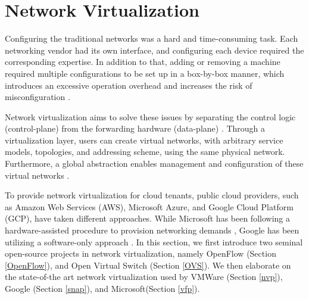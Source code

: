 
\section{Network Virtualization}
%
%
%
%
%


Configuring the traditional networks was a hard and time-consuming task. Each networking vendor had its own interface, and configuring each device required the corresponding expertise. In addition to that, adding or removing a machine required multiple configurations to be set up in a box-by-box manner, which introduces an excessive operation overhead and increases the risk of misconfiguration \cite{cearley2013top, marty2019snap}.

Network virtualization aims to solve these issues by separating the control logic (control-plane) from the forwarding hardware (data-plane) \cite{koponen2014network, caesar2005design, casado2007ethane, gude2008nox, koponen2010onix, mckeown2008openflow}. Through a virtualization layer, users can create virtual networks, with arbitrary service models, topologies, and addressing scheme, using the same physical network. Furthermore, a global abstraction enables management and configuration of these virtual networks \cite{mckeown2008openflow}.

To provide network virtualization for cloud tenants, public cloud providers, such as Amazon Web Services (AWS), Microsoft Azure, and Google Cloud Platform (GCP), have taken different approaches. While Microsoft has been following a hardware-assisted procedure to provision networking demands \cite{firestone2018azure, firestone2017vfp}, Google has been utilizing a software-only approach \cite{marty2019snap}. In this section, we first introduce two seminal open-source projects in network virtualization, namely OpenFlow (Section \ref{OpenFlow}), and Open Virtual Switch (Section \ref{OVS}). We then elaborate on the state-of-the art network virtualization used by VMWare (Section \ref{nvp}), Google (Section \ref{snap}), and Microsoft(Section \ref{vfp}).




